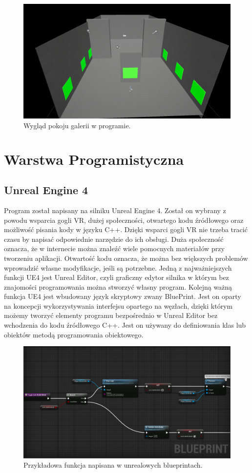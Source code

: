 \documentclass[a4paper,12pt,reqno]{article}
\begin{document}
\begin{figure}[!ht]%
\centering
\includegraphics[width=0.8\columnwidth]{graphics/Level.png}
\caption{Wygląd pokoju galerii w programie.
\label{OpenBrush}}%
%
\qquad
\end{figure}  

\newpage
\section{Warstwa Programistyczna}

\subsection{Unreal Engine 4}

Program został napisany na silniku Unreal Engine 4. Został on wybrany z powodu wsparcia gogli VR, dużej społeczności, otwartego kodu źródłowego oraz możliwość pisania kody w języku C++. Dzięki wsparci gogli VR nie trzeba tracić czasu by napisać odpowiednie narzędzie do ich obsługi. Duża społeczność oznacza, że w internecie można znaleźć wiele pomocnych materiałów przy tworzeniu aplikacji. Otwartość kodu oznacza, że można bez większych problemów wprowadzić własne modyfikacje, jeśli są potrzebne. Jedną z najważniejszych funkcji UE4 jest Unreal Editor, czyli graficzny edytor silnika w którym bez znajomości programowania można stworzyć własny program. Kolejną ważną funkcja UE4 jest wbudowany język skryptowy zwany BluePrint. Jest on oparty na koncepcji wykorzystywania interfejsu opartego na węzłach, dzięki którym możemy tworzyć elementy programu bezpośrednio w Unreal Editor bez wchodzenia do kodu źródłowego C++. Jest on używany do definiowania klas lub obiektów metodą programowania obiektowego.

\begin{figure}[!ht]%
\centering
\includegraphics[width=0.8\columnwidth]{graphics/BPExample.png}
\caption{Przykładowa funkcja napisana w unrealowych blueprintach.
\label{BPExample}}%
%
\qquad
\end{figure}  
\end{document}
